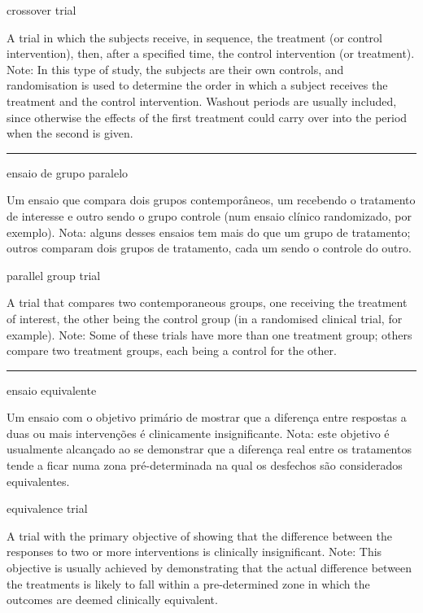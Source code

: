 \documentclass[
]{book}
\begin{document}
crossover trial

A trial in which the subjects receive, in sequence, the treatment (or control intervention), then, after a specified time, the control intervention (or treatment). Note: In this type of study, the subjects are their own controls, and randomisation is used to determine the order in which a subject receives the treatment and the control intervention. Washout periods are usually included, since otherwise the effects of the first treatment could carry over into the period when the second is given.

\begin{center}\rule{0.5\linewidth}{0.5pt}\end{center}

ensaio de grupo paralelo

Um ensaio que compara dois grupos contemporâneos, um recebendo o tratamento de interesse e outro sendo o grupo controle (num ensaio clínico randomizado, por exemplo). Nota: alguns desses ensaios tem mais do que um grupo de tratamento; outros comparam dois grupos de tratamento, cada um sendo o controle do outro.

parallel group trial

A trial that compares two contemporaneous groups, one receiving the treatment of interest, the other being the control group (in a randomised clinical trial, for example). Note: Some of these trials have more than one treatment group; others compare two treatment groups, each being a control for the other.

\begin{center}\rule{0.5\linewidth}{0.5pt}\end{center}

ensaio equivalente

Um ensaio com o objetivo primário de mostrar que a diferença entre respostas a duas ou mais intervenções é clinicamente insignificante. Nota: este objetivo é usualmente alcançado ao se demonstrar que a diferença real entre os tratamentos tende a ficar numa zona pré-determinada na qual os desfechos são considerados equivalentes.

equivalence trial

A trial with the primary objective of showing that the difference between the responses to two or more interventions is clinically insignificant. Note: This objective is usually achieved by demonstrating that the actual difference between the treatments is likely to fall within a pre-determined zone in which the outcomes are deemed clinically equivalent.
\end{document}
